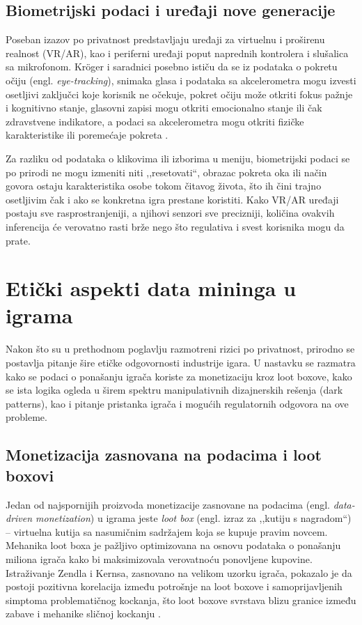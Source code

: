 \documentclass[12pt]{article}
\begin{document}
\subsection{Biometrijski podaci i uređaji nove generacije}

Poseban izazov po privatnost predstavljaju uređaji za virtuelnu i proširenu realnost (VR/AR), kao i periferni uređaji poput naprednih kontrolera i slušalica sa mikrofonom. Kröger i saradnici posebno ističu da se iz podataka o pokretu očiju (engl. \textit{eye-tracking}), snimaka glasa i podataka sa akcelerometra mogu izvesti osetljivi zaključci koje korisnik ne očekuje, pokret očiju može otkriti fokus pažnje i kognitivno stanje, glasovni zapisi mogu otkriti emocionalno stanje ili čak zdravstvene indikatore, a podaci sa akcelerometra mogu otkriti fizičke karakteristike ili poremećaje pokreta \cite{kroger2023}.

Za razliku od podataka o klikovima ili izborima u meniju, biometrijski podaci se po prirodi ne mogu izmeniti niti ,,resetovati``, obrazac pokreta oka ili način govora ostaju karakteristika osobe tokom čitavog života, što ih čini trajno osetljivim čak i ako se konkretna igra prestane koristiti. Kako VR/AR uređaji postaju sve rasprostranjeniji, a njihovi senzori sve precizniji, količina ovakvih inferencija će verovatno rasti brže nego što regulativa i svest korisnika mogu da prate.

\section{Etički aspekti data mininga u igrama}\label{sec:eticki}

Nakon što su u prethodnom poglavlju razmotreni rizici po privatnost, prirodno se postavlja pitanje šire etičke odgovornosti industrije igara. U nastavku se razmatra kako se podaci o ponašanju igrača koriste za monetizaciju kroz loot boxove, kako se ista logika ogleda u širem spektru manipulativnih dizajnerskih rešenja (dark patterns), kao i pitanje pristanka igrača i mogućih regulatornih odgovora na ove probleme.
\subsection{Monetizacija zasnovana na podacima i loot boxovi}

Jedan od najspornijih proizvoda monetizacije zasnovane na podacima (engl. \textit{data-driven monetization}) u igrama jeste \textit{loot box} (engl. izraz za ,,kutiju s nagradom``) -- virtuelna kutija sa nasumičnim sadržajem koja se kupuje pravim novcem. Mehanika loot boxa je pažljivo optimizovana na osnovu podataka o ponašanju miliona igrača kako bi maksimizovala verovatnoću ponovljene kupovine. Istraživanje Zendla i Kernsa, zasnovano na velikom uzorku igrača, pokazalo je da postoji pozitivna korelacija između potrošnje na loot boxove i samoprijavljenih simptoma problematičnog kockanja, što loot boxove svrstava blizu granice između zabave i mehanike sličnoj kockanju \cite{zendle2018}.
\end{document}
